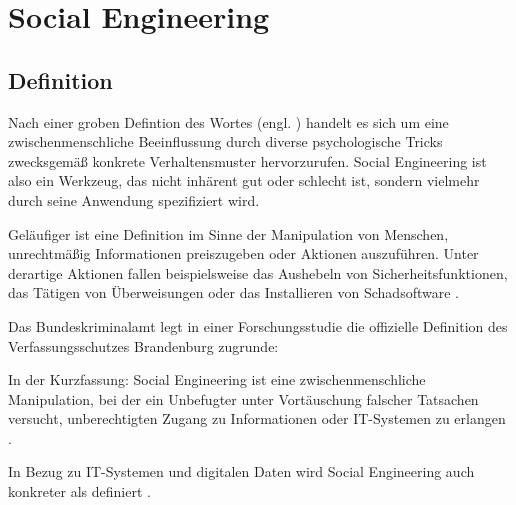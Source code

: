 \chapter{Social Engineering}
\label{chapter:se}

\section{Definition}

Nach einer groben Defintion des Wortes  (engl. )
handelt es sich um eine zwischenmenschliche Beeinflussung durch diverse psychologische
Tricks zwecksgemäß konkrete Verhaltensmuster hervorzurufen.
Social Engineering ist also ein Werkzeug, das nicht inhärent gut oder schlecht ist, sondern vielmehr durch seine Anwendung spezifiziert wird.


Geläufiger ist eine Definition im Sinne der Manipulation von Menschen, unrechtmäßig Informationen preiszugeben oder Aktionen auszuführen.
Unter derartige Aktionen fallen beispielsweise das Aushebeln von Sicherheitsfunktionen, das Tätigen von Überweisungen oder
das Installieren von Schadsoftware .

Das Bundeskriminalamt legt in einer Forschungsstudie die offizielle Definition des Verfassungsschutzes Brandenburg
zugrunde: 

In der Kurzfassung: Social Engineering ist eine zwischenmenschliche Manipulation,
bei der ein Unbefugter unter Vortäuschung falscher Tatsachen versucht, unberechtigten Zugang zu Informationen oder IT-Systemen zu erlangen .

In Bezug zu IT-Systemen und digitalen Daten wird Social Engineering auch konkreter als  definiert .

